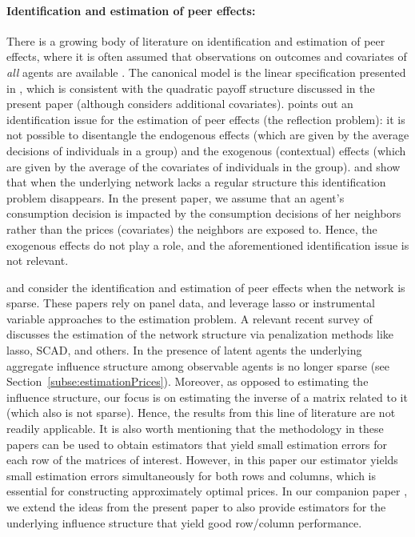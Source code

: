 \documentclass[opre,nonblindrev]{informs3} %
\begin{document}
\paragraph{Identification and estimation of peer effects:}
There is a growing body of literature on identification and estimation of peer effects, where
 it is often assumed that observations on outcomes and covariates of \emph{all} agents are available \citep[e.g.,][]{sacerdote2001peer,calvo2009peer,epple2011peer}.
The canonical model is the linear specification presented in \citet{manski1993identification}, which is consistent with the quadratic payoff structure discussed in the present paper (although \citet{manski1993identification} considers additional covariates).  \citet{manski1993identification}
points out
an identification issue for the estimation of peer effects (the reflection problem):
it is not possible to disentangle the endogenous effects (which are given by the average decisions of individuals in a group) and the exogenous (contextual) effects (which are given by the average of the covariates of individuals in the group).
\citet{bramoulle2009identification} and \citet{blume2015linear} show that  when the underlying network lacks a regular structure this identification problem disappears.
In the present paper, we assume that
an agent's   consumption decision is impacted  by the consumption decisions of her neighbors rather than the prices (covariates) the neighbors are exposed to. Hence, the exogenous effects do not play a role, and the aforementioned identification issue is not relevant. 



\citet{manresa2013estimating} and \citet{rose2017identification} consider the identification and estimation of peer effects when the network is sparse. These papers rely on panel data, and leverage  lasso or instrumental variable approaches
\citep[e.g., due to][]{gautier2014high} to the estimation problem.
A relevant recent survey of \citet{de2015econometrics} discusses the estimation of the network structure via penalization methods like lasso, SCAD, and others.
In the presence of latent agents the underlying aggregate influence structure among observable agents is no longer sparse (see Section~\ref{subse:estimationPrices}).
	Moreover, as opposed to estimating the influence structure, our focus is on estimating the inverse of a matrix  related to it (which also is not sparse).
Hence, the results from this line of literature are not readily applicable.
It is also worth mentioning that 
the methodology in these papers can be used to obtain 
estimators that yield small estimation errors for each row of the matrices of interest.
However, in this paper our estimator yields small estimation errors simultaneously for both rows and columns, which is essential for constructing approximately optimal prices.
In our companion paper \citep{ata2018IVnetwork},
we extend the ideas from the present paper to also provide estimators for the underlying influence structure that yield good row/column performance.
 
\end{document}
